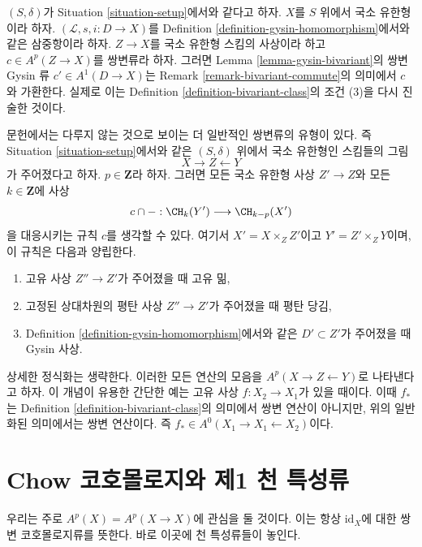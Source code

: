 \begin{example}
\label{example-gysin-commute}
$(S, \delta)$가 Situation \ref{situation-setup}에서와 같다고 하자.
$X$를 $S$ 위에서 국소 유한형이라 하자.
$(\mathcal{L}, s, i : D \to X)$를 Definition
\ref{definition-gysin-homomorphism}에서와 같은 삼중항이라 하자.
$Z \to X$를 국소 유한형 스킴의 사상이라 하고
$c \in A^p(Z \to X)$를 쌍변류라 하자. 그러면 Lemma
\ref{lemma-gysin-bivariant}의 쌍변 Gysin 류
$c' \in A^1(D \to X)$는 Remark \ref{remark-bivariant-commute}의 의미에서
$c$와 가환한다. 실제로 이는 Definition
\ref{definition-bivariant-class}의 조건 (3)을 다시 진술한 것이다.
\end{example}

\begin{remark}
\label{remark-more-general-bivariant}
문헌에서는 다루지 않는 것으로 보이는 더 일반적인 쌍변류의 유형이
있다. 즉 Situation \ref{situation-setup}에서와 같은 $(S, \delta)$ 위에서
국소 유한형인 스킴들의 그림
$$
X \longrightarrow Z \longleftarrow Y
$$
가 주어졌다고 하자. $p \in \mathbf{Z}$라 하자. 그러면 모든 국소
유한형 사상 $Z' \to Z$와 모든 $k \in \mathbf{Z}$에 사상
$$
c \cap - : \CH_k(Y') \longrightarrow \CH_{k - p}(X')
$$
을 대응시키는 규칙 $c$를 생각할 수 있다. 여기서
$X' = X \times_Z Z'$이고 $Y' = Z' \times_Z Y$이며, 이 규칙은 다음과
양립한다.
\begin{enumerate}
\item 고유 사상 $Z'' \to Z'$가 주어졌을 때 고유 밂,
\item 고정된 상대차원의 평탄 사상 $Z'' \to Z'$가 주어졌을 때 평탄
당김,
\item Definition \ref{definition-gysin-homomorphism}에서와 같은
$D' \subset Z'$가 주어졌을 때 Gysin 사상.
\end{enumerate}
상세한 정식화는 생략한다. 이러한 모든 연산의 모음을
$A^p(X \to Z \leftarrow Y)$로 나타낸다고 하자. 이 개념이 유용한 간단한
예는 고유 사상 $f : X_2 \to X_1$가 있을 때이다. 이때 $f_*$는 Definition
\ref{definition-bivariant-class}의 의미에서 쌍변 연산이 아니지만, 위의
일반화된 의미에서는 쌍변 연산이다. 즉
$f_* \in A^0(X_1 \to X_1 \leftarrow X_2)$이다.
\end{remark}





\section{Chow 코호몰로지와 제1 천 특성류}
\label{section-chow-cohomology}

\noindent
우리는 주로 $A^p(X) = A^p(X \to X)$에 관심을 둘 것이다. 이는 항상
$\text{id}_X$에 대한 쌍변 코호몰로지류를 뜻한다. 바로 이곳에 천
특성류들이 놓인다.

